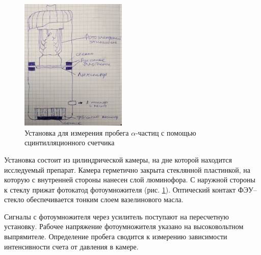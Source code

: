 	\newpage
	
	\begin{figure}
		\centering
		\includegraphics[width=0.45\textwidth]{Pictures/ScintillationChamber}
		\caption{Установка для измерения пробега $\alpha$-частиц с помощью сцинтилляционного счетчика}
		\label{AlphaParticles_ScintillationChamber}
	\end{figure}
	
	
	Установка состоит из цилиндрической камеры, на дне которой находится исследуемый препарат. Камера герметично закрыта стеклянной пластинкой, на которую с внутренней стороны нанесен слой люминофора. С наружной стороны к стеклу прижат фотокатод фотоумножителя (рис. \ref{AlphaParticles_ScintillationChamber}). Оптический контакт ФЭУ–стекло обеспечивается тонким слоем вазелинового масла.

	Сигналы с фотоумножителя через усилитель поступают на пересчетную установку. Рабочее напряжение фотоумножителя указано на высоковольтном выпрямителе. Определение пробега сводится к измерению зависимости интенсивности счета от давления в камере.
	
